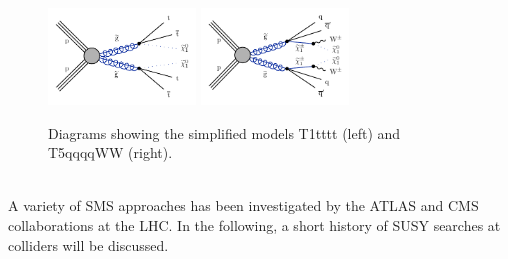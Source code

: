 \begin{figure}[!hb]
  \includegraphics[width=0.35\textwidth]{Plots/feyndiagrams/T1tttt.pdf}
  \hfil
  \includegraphics[width=0.35\textwidth]{Plots/feyndiagrams/T5qqqqWW.pdf}
  \hfil
\centering
  \caption{\label{fig:diagrams} Diagrams showing the simplified models T1tttt (left) and
T5qqqqWW (right).  %
  }
\end{figure}
\\
A variety of SMS approaches has been investigated by the ATLAS and CMS collaborations at the LHC. In the following, a short history of SUSY searches at colliders will be discussed.


